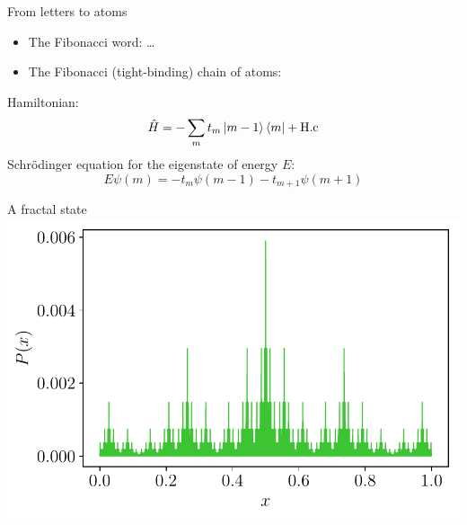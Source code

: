 \begin{frame}{From letters to atoms}
\begin{itemize}
	\item The Fibonacci word:
	\ca\cb\ca\ca\cb\ca\cb\ca\dots
	
	\item The Fibonacci (tight-binding) chain of atoms:
	
	{\centering
	}

\end{itemize}
Hamiltonian:
\[
	\hat{H} = - \sum_m t_m \ket{m-1} \bra{m} + \text{H.c}
\]
Schrödinger equation for the eigenstate of energy $E$:
\[
	E \psi(m) = -t_{m}\psi(m-1) -t_{m+1}\psi(m+1)
\]
\end{frame}

\begin{frame}{A fractal state}
\centering
\includegraphics[width=.7\textwidth]{img/2_part1/heights_fibo}

\end{frame}